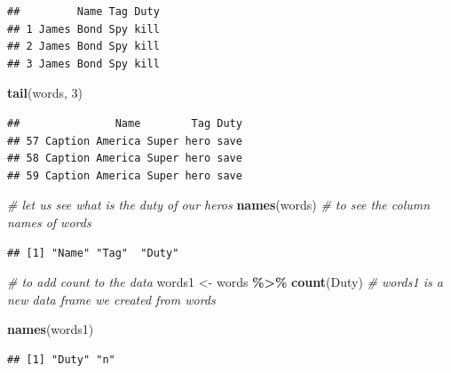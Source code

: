 \documentclass[
]{book}
\newenvironment{Shaded}{\begin{snugshade}}{\end{snugshade}}
\newcommand{\CommentTok}[1]{\textcolor[rgb]{0.56,0.35,0.01}{\textit{#1}}}
\newcommand{\DecValTok}[1]{\textcolor[rgb]{0.00,0.00,0.81}{#1}}
\newcommand{\FunctionTok}[1]{\textcolor[rgb]{0.13,0.29,0.53}{\textbf{#1}}}
\newcommand{\NormalTok}[1]{#1}
\newcommand{\OtherTok}[1]{\textcolor[rgb]{0.56,0.35,0.01}{#1}}
\newcommand{\SpecialCharTok}[1]{\textcolor[rgb]{0.81,0.36,0.00}{\textbf{#1}}}
\begin{document}
\begin{verbatim}
##         Name Tag Duty
## 1 James Bond Spy kill
## 2 James Bond Spy kill
## 3 James Bond Spy kill
\end{verbatim}

\begin{Shaded}
\begin{Highlighting}[]
\FunctionTok{tail}\NormalTok{(words, }\DecValTok{3}\NormalTok{)}
\end{Highlighting}
\end{Shaded}

\begin{verbatim}
##               Name        Tag Duty
## 57 Caption America Super hero save
## 58 Caption America Super hero save
## 59 Caption America Super hero save
\end{verbatim}

\begin{Shaded}
\begin{Highlighting}[]
\CommentTok{\# let us see what is the duty of our heros}
\FunctionTok{names}\NormalTok{(words) }\CommentTok{\# to see the column names of words}
\end{Highlighting}
\end{Shaded}

\begin{verbatim}
## [1] "Name" "Tag"  "Duty"
\end{verbatim}

\begin{Shaded}
\begin{Highlighting}[]
\CommentTok{\# to add count to the data}
\NormalTok{words1 }\OtherTok{\textless{}{-}}\NormalTok{ words }\SpecialCharTok{\%\textgreater{}\%} \FunctionTok{count}\NormalTok{(Duty) }\CommentTok{\# words1 is a new data frame we created from words}
\end{Highlighting}
\end{Shaded}

\begin{Shaded}
\begin{Highlighting}[]
\FunctionTok{names}\NormalTok{(words1)}
\end{Highlighting}
\end{Shaded}

\begin{verbatim}
## [1] "Duty" "n"
\end{verbatim}

\begin{Shaded}
\end{Shaded}
\end{document}
